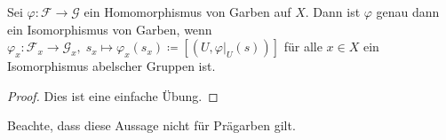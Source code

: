 \begin{prop}
	Sei $\varphi \colon \mathcal{F} \to \mathcal{G}$ ein Homomorphismus von Garben auf $X$. Dann ist $\varphi$ genau dann ein Isomorphismus von Garben, wenn $\varphi_x \colon \mathcal{F}_x \to \mathcal{G}_x,\; s_x \mapsto \varphi_x(s_x) \coloneqq [(U,\varphi\vert_U(s))]$ für alle $x \in X$ ein Isomorphismus abelscher Gruppen ist.
	\begin{proof}
		Dies ist eine einfache Übung.
	\end{proof}
	Beachte, dass diese Aussage nicht für Prägarben gilt.
\end{prop}
